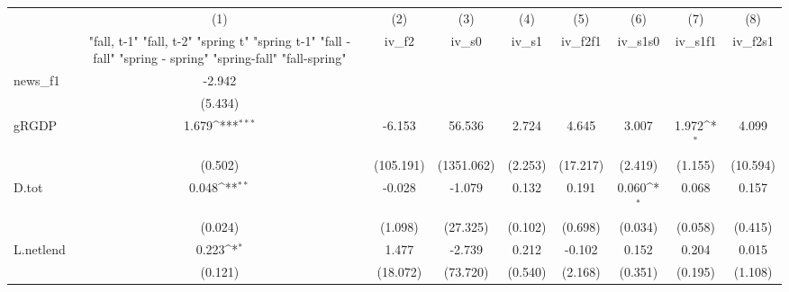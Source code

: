 {
\def\sym#1{\ifmmode^{#1}\else\(^{#1}\)\fi}
\begin{tabular}{l*{8}{c}}
\toprule
            &\multicolumn{1}{c}{(1)}&\multicolumn{1}{c}{(2)}&\multicolumn{1}{c}{(3)}&\multicolumn{1}{c}{(4)}&\multicolumn{1}{c}{(5)}&\multicolumn{1}{c}{(6)}&\multicolumn{1}{c}{(7)}&\multicolumn{1}{c}{(8)}\\
            &\multicolumn{1}{c}{  "fall, t-1" "fall, t-2" "spring t" "spring t-1"  "fall - fall" "spring - spring" "spring-fall" "fall-spring" }&\multicolumn{1}{c}{iv\_f2}&\multicolumn{1}{c}{iv\_s0}&\multicolumn{1}{c}{iv\_s1}&\multicolumn{1}{c}{iv\_f2f1}&\multicolumn{1}{c}{iv\_s1s0}&\multicolumn{1}{c}{iv\_s1f1}&\multicolumn{1}{c}{iv\_f2s1}\\
\midrule
news\_f1     &      -2.942         &                     &                     &                     &                     &                     &                     &                     \\
            &     (5.434)         &                     &                     &                     &                     &                     &                     &                     \\
\addlinespace
gRGDP       &       1.679\sym{***}&      -6.153         &      56.536         &       2.724         &       4.645         &       3.007         &       1.972\sym{*}  &       4.099         \\
            &     (0.502)         &   (105.191)         &  (1351.062)         &     (2.253)         &    (17.217)         &     (2.419)         &     (1.155)         &    (10.594)         \\
\addlinespace
D.tot       &       0.048\sym{**} &      -0.028         &      -1.079         &       0.132         &       0.191         &       0.060\sym{*}  &       0.068         &       0.157         \\
            &     (0.024)         &     (1.098)         &    (27.325)         &     (0.102)         &     (0.698)         &     (0.034)         &     (0.058)         &     (0.415)         \\
\addlinespace
L.netlend   &       0.223\sym{*}  &       1.477         &      -2.739         &       0.212         &      -0.102         &       0.152         &       0.204         &       0.015         \\
            &     (0.121)         &    (18.072)         &    (73.720)         &     (0.540)         &     (2.168)         &     (0.351)         &     (0.195)         &     (1.108)         \\

\end{tabular}}
